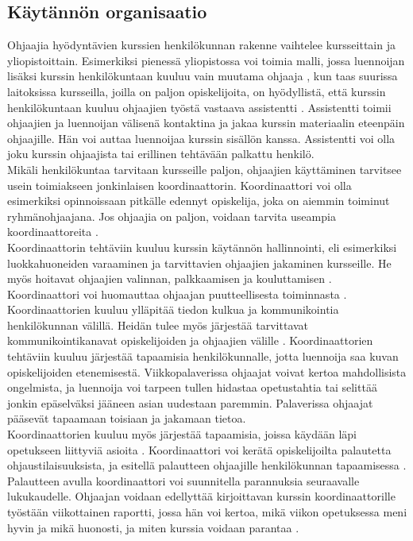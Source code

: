 \documentclass[finnish]{tktltiki2}
\theoremstyle{definition}
\theoremstyle{remark}
\begin{document}
\subsection{Käytännön organisaatio}

Ohjaajia hyödyntävien kurssien henkilökunnan rakenne vaihtelee kursseittain ja yliopistoittain. Esimerkiksi pienessä yliopistossa voi toimia malli, jossa luennoijan lisäksi kurssin henkilökuntaan kuuluu vain muutama ohjaaja \cite{Dickson11}, kun taas suurissa laitoksissa kursseilla, joilla on paljon opiskelijoita, on hyödyllistä, että kurssin henkilökuntaan kuuluu ohjaajien työstä vastaava assistentti \cite{Reges03}. Assistentti toimii ohjaajien ja luennoijan välisenä kontaktina ja jakaa kurssin materiaalin eteenpäin ohjaajille. Hän voi auttaa luennoijaa kurssin sisällön kanssa. Assistentti voi olla joku kurssin ohjaajista tai erillinen tehtävään palkattu henkilö.
\\
Mikäli henkilökuntaa tarvitaan kursseille paljon, ohjaajien käyttäminen tarvitsee usein toimiakseen jonkinlaisen koordinaattorin. Koordinaattori voi olla esimerkiksi opinnoissaan pitkälle edennyt opiskelija, joka on aiemmin toiminut ryhmänohjaajana. Jos ohjaajia on paljon, voidaan tarvita useampia koordinaattoreita \cite{Roberts95}.
\\
Koordinaattorin tehtäviin kuuluu kurssin käytännön hallinnointi, eli esimerkiksi luokkahuoneiden varaaminen ja tarvittavien ohjaajien jakaminen kursseille. He myös hoitavat ohjaajien valinnan, palkkaamisen ja kouluttamisen \cite{Reges88,Roberts95}. Koordinaattori voi huomauttaa ohjaajan puutteellisesta toiminnasta \cite{Reges88}.
\\
Koordinaattorien kuuluu ylläpitää tiedon kulkua ja kommunikointia henkilökunnan välillä. Heidän tulee myös järjestää tarvittavat kommunikointikanavat opiskelijoiden ja ohjaajien välille \cite{Reges88}. Koordinaattorien tehtäviin kuuluu järjestää tapaamisia henkilökunnalle, jotta luennoija saa kuvan opiskelijoiden etenemisestä. Viikkopalaverissa ohjaajat voivat kertoa mahdollisista ongelmista, ja luennoija voi tarpeen tullen hidastaa opetustahtia tai selittää jonkin epäselväksi jääneen asian uudestaan paremmin. Palaverissa ohjaajat pääsevät tapaamaan toisiaan ja jakamaan tietoa. 
\\
Koordinaattorien kuuluu myös järjestää tapaamisia, joissa käydään läpi opetukseen liittyviä asioita \cite{Reges88, Roberts95}. Koordinaattori voi kerätä opiskelijoilta palautetta ohjaustilaisuuksista, ja esitellä palautteen ohjaajille henkilökunnan tapaamisessa \cite{Patitsas12_2}. Palautteen avulla koordinaattori voi suunnitella parannuksia seuraavalle lukukaudelle. Ohjaajan voidaan edellyttää kirjoittavan kurssin koordinaattorille työstään viikottainen raportti, jossa hän voi kertoa, mikä viikon opetuksessa meni hyvin ja mikä huonosti, ja miten kurssia voidaan parantaa \cite{Hug11}.
\end{document}
